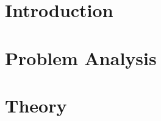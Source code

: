 


\frontmatter %


\cleardoublepage %


\cleardoublepage

\cleardoublepage

\cleardoublepage



\setlength\parskip{0ex} %
\tableofcontents* %
\setlength{\parskip}{3mm} %



\label{marker}
\mainmatter

\pagestyle{custom}


\chapter{Introduction} 


\chapter{Problem Analysis}
\label{chap:problem}









\chapter{Theory}
\label{chap:theory}




